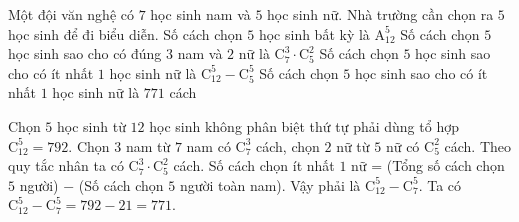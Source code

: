 \begin{ex}%
	Một đội văn nghệ có $7$ học sinh nam và $5$ học sinh nữ. Nhà trường cần chọn ra $5$ học sinh để đi biểu diễn.
	\choiceTF
	{Số cách chọn $5$ học sinh bất kỳ là $\mathrm{A}_{12}^5$}
	{\True Số cách chọn $5$ học sinh sao cho có đúng $3$ nam và $2$ nữ là $\mathrm{C}_7^3 \cdot \mathrm{C}_5^2$}
	{Số cách chọn $5$ học sinh sao cho có ít nhất $1$ học sinh nữ là $\mathrm{C}_{12}^5 - \mathrm{C}_5^5$}
	{\True Số cách chọn $5$ học sinh sao cho có ít nhất $1$ học sinh nữ là $771$ cách}
	\loigiai
	{
		\begin{itemchoice}
			\itemch Chọn $5$ học sinh từ $12$ học sinh không phân biệt thứ tự phải dùng tổ hợp $\mathrm{C}_{12}^5 = 792$.
			\itemch Chọn $3$ nam từ $7$ nam có $\mathrm{C}_7^3$ cách, chọn $2$ nữ từ $5$ nữ có $\mathrm{C}_5^2$ cách. Theo quy tắc nhân ta có $\mathrm{C}_7^3 \cdot \mathrm{C}_5^2$ cách.
			\itemch Số cách chọn ít nhất $1$ nữ = (Tổng số cách chọn $5$ người) $-$ (Số cách chọn $5$ người toàn nam). Vậy phải là $\mathrm{C}_{12}^5 - \mathrm{C}_7^5$.
			\itemch Ta có $\mathrm{C}_{12}^5 - \mathrm{C}_7^5 = 792 - 21 = 771$.
		\end{itemchoice}
	}
\end{ex}
